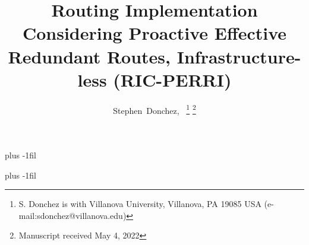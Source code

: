 \documentclass[11pt, journal, onecolumn, letterpaper,]{LaTeX_Assets/IEEETransactions_LaTeX/IEEEtran/IEEEtran}
\begin{document}
    \title{Routing Implementation Considering Proactive Effective Redundant Routes, Infrastructure-less (RIC-PERRI)}
    \author{Stephen~Donchez,~%
    \thanks{S. Donchez is with Villanova University, Villanova, PA 19085 USA 
    \mbox{(e-mail:sdonchez@villanova.edu)}}%
    \thanks{Manuscript received May 4, 2022}}%

    \maketitle

    

    

    
    
    

    

    
    

    \vskip 0pt plus -1fil
    
    
    \vskip 0pt plus -1fil
    
\end{document}
